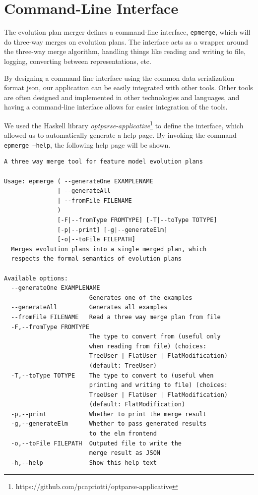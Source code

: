 \documentclass[a4paper,english]{ifimaster}
\begin{document}
\section{Command-Line Interface}%
\label{sec:command_line_interface}

The evolution plan merger defines a command-line interface, \texttt{epmerge}, which will do three-way merges on evolution plans. The interface acts as a wrapper around the three-way merge algorithm, handling things like reading and writing to file, logging, converting between representations, etc. 

By designing a command-line interface using the common data serialization format json, our application can be easily integrated with other tools. Other tools are often designed and implemented in other technologies and languages, and having a command-line interface allows for easier integration of the tools.

We used the Haskell library \textit{optparse-applicative}\footnote{https://github.com/pcapriotti/optparse-applicative} to define the interface, which allowed us to automatically generate a help page. By invoking the command \texttt{epmerge --help}, the following help page will be shown.

\begin{verbatim}
A three way merge tool for feature model evolution plans

Usage: epmerge ( --generateOne EXAMPLENAME 
               | --generateAll 
               | --fromFile FILENAME
               )
               [-F|--fromType FROMTYPE] [-T|--toType TOTYPE] 
               [-p|--print] [-g|--generateElm] 
               [-o|--toFile FILEPATH]
  Merges evolution plans into a single merged plan, which 
  respects the formal semantics of evolution plans

Available options:
  --generateOne EXAMPLENAME
                        Generates one of the examples
  --generateAll         Generates all examples
  --fromFile FILENAME   Read a three way merge plan from file
  -F,--fromType FROMTYPE   
                        The type to convert from (useful only 
                        when reading from file) (choices: 
                        TreeUser | FlatUser | FlatModification) 
                        (default: TreeUser)
  -T,--toType TOTYPE    The type to convert to (useful when 
                        printing and writing to file) (choices: 
                        TreeUser | FlatUser | FlatModification) 
                        (default: FlatModification)
  -p,--print            Whether to print the merge result
  -g,--generateElm      Whether to pass generated results 
                        to the elm frontend
  -o,--toFile FILEPATH  Outputed file to write the 
                        merge result as JSON
  -h,--help             Show this help text
\end{verbatim}
\end{document}
